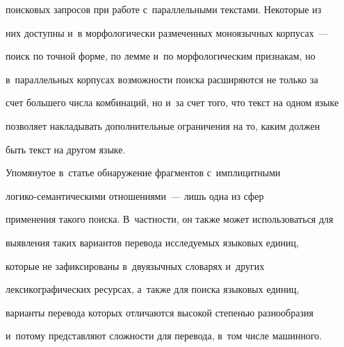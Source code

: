 поисковых запросов при работе с~параллельными текс\-та\-ми. Некоторые из 


них доступны и~в морфологически размеченных моноязычных корпусах~--- 


поиск по точной форме, по лемме и~по морфологическим признакам, но 


в~параллельных корпусах возможности поиска расширяются не только за 


счет большего чис\-ла комбинаций, но и~за счет того, что текст на одном языке 


позволяет накладывать дополнительные ограничения на то, каким должен 


быть текст на другом языке.





Упомянутое в~статье обнаружение фрагментов с~имплицитными  


ло\-ги\-ко-се\-ман\-ти\-че\-ски\-ми отношениями~--- лишь одна из сфер 


применения такого поиска. В~част\-ности, он так\-же может использоваться для 


выявления таких вариантов перевода исследуемых языковых единиц, 


которые не зафиксированы в~двуязычных словарях и~других 


лексикографических ресурсах, а~так\-же для поиска языковых единиц, 


варианты перевода которых отличаются высокой степенью разнообразия 


и~потому пред\-став\-ля\-ют сложности для перевода, в~том чис\-ле ма\-шин\-ного.


   


